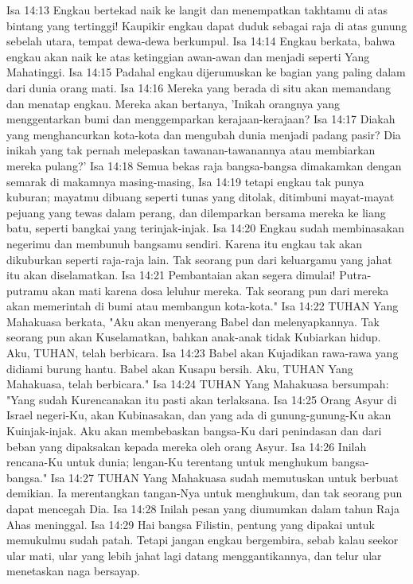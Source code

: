 Isa 14:13  Engkau bertekad naik ke langit dan menempatkan takhtamu di atas bintang yang tertinggi! Kaupikir engkau dapat duduk sebagai raja di atas gunung sebelah utara, tempat dewa-dewa berkumpul.
Isa 14:14  Engkau berkata, bahwa engkau akan naik ke atas ketinggian awan-awan dan menjadi seperti Yang Mahatinggi.
Isa 14:15  Padahal engkau dijerumuskan ke bagian yang paling dalam dari dunia orang mati.
Isa 14:16  Mereka yang berada di situ akan memandang dan menatap engkau. Mereka akan bertanya, 'Inikah orangnya yang menggentarkan bumi dan menggemparkan kerajaan-kerajaan?
Isa 14:17  Diakah yang menghancurkan kota-kota dan mengubah dunia menjadi padang pasir? Dia inikah yang tak pernah melepaskan tawanan-tawanannya atau membiarkan mereka pulang?'
Isa 14:18  Semua bekas raja bangsa-bangsa dimakamkan dengan semarak di makamnya masing-masing,
Isa 14:19  tetapi engkau tak punya kuburan; mayatmu dibuang seperti tunas yang ditolak, ditimbuni mayat-mayat pejuang yang tewas dalam perang, dan dilemparkan bersama mereka ke liang batu, seperti bangkai yang terinjak-injak.
Isa 14:20  Engkau sudah membinasakan negerimu dan membunuh bangsamu sendiri. Karena itu engkau tak akan dikuburkan seperti raja-raja lain. Tak seorang pun dari keluargamu yang jahat itu akan diselamatkan.
Isa 14:21  Pembantaian akan segera dimulai! Putra-putramu akan mati karena dosa leluhur mereka. Tak seorang pun dari mereka akan memerintah di bumi atau membangun kota-kota."
Isa 14:22  TUHAN Yang Mahakuasa berkata, "Aku akan menyerang Babel dan melenyapkannya. Tak seorang pun akan Kuselamatkan, bahkan anak-anak tidak Kubiarkan hidup. Aku, TUHAN, telah berbicara.
Isa 14:23  Babel akan Kujadikan rawa-rawa yang didiami burung hantu. Babel akan Kusapu bersih. Aku, TUHAN Yang Mahakuasa, telah berbicara."
Isa 14:24  TUHAN Yang Mahakuasa bersumpah: "Yang sudah Kurencanakan itu pasti akan terlaksana.
Isa 14:25  Orang Asyur di Israel negeri-Ku, akan Kubinasakan, dan yang ada di gunung-gunung-Ku akan Kuinjak-injak. Aku akan membebaskan bangsa-Ku dari penindasan dan dari beban yang dipaksakan kepada mereka oleh orang Asyur.
Isa 14:26  Inilah rencana-Ku untuk dunia; lengan-Ku terentang untuk menghukum bangsa-bangsa."
Isa 14:27  TUHAN Yang Mahakuasa sudah memutuskan untuk berbuat demikian. Ia merentangkan tangan-Nya untuk menghukum, dan tak seorang pun dapat mencegah Dia.
Isa 14:28  Inilah pesan yang diumumkan dalam tahun Raja Ahas meninggal.
Isa 14:29  Hai bangsa Filistin, pentung yang dipakai untuk memukulmu sudah patah. Tetapi jangan engkau bergembira, sebab kalau seekor ular mati, ular yang lebih jahat lagi datang menggantikannya, dan telur ular menetaskan naga bersayap.
